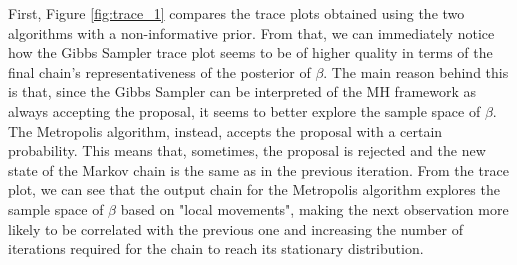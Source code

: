 \documentclass{article}
\begin{document}

First, Figure \ref{fig:trace_1} compares the trace plots obtained using the two algorithms with a non-informative prior. From that, we can immediately notice how the Gibbs Sampler trace plot seems to be of higher quality in terms of the final chain's representativeness of the posterior of \(\beta\). The main reason behind this is that, since the Gibbs Sampler can be interpreted of the MH framework as always accepting the proposal, it seems to better explore the sample space of \(\beta\). The Metropolis algorithm, instead, accepts the proposal with a certain probability. This means that, sometimes, the proposal is rejected and the new state of the Markov chain is the same as in the previous iteration. From the trace plot, we can see that the output chain for the Metropolis algorithm explores the sample space of \(\beta\) based on "local movements", making the next observation more likely to be correlated with the previous one and increasing the number of iterations required for the chain to reach its stationary distribution. 
\end{document}

